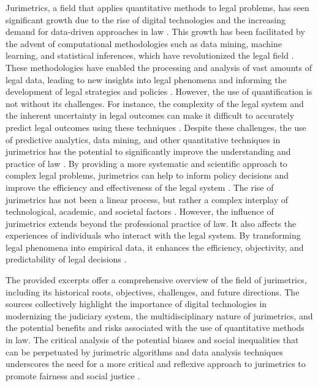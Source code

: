Jurimetrics, a field that applies quantitative methods to legal problems, has seen significant growth due to the rise of digital technologies and the increasing demand for data-driven approaches in law \cite{biasquantitativeanalyses1,loevinger1959}. This growth has been facilitated by the advent of computational methodologies such as data mining, machine learning, and statistical inferences, which have revolutionized the legal field \cite{loevinger1959}. These methodologies have enabled the processing and analysis of vast amounts of legal data, leading to new insights into legal phenomena and informing the development of legal strategies and policies \cite{ccdacdfbcdaf,efbfffafaacadd,loevinger1959}. However, the use of quantification is not without its challenges. For instance, the complexity of the legal system and the inherent uncertainty in legal outcomes can make it difficult to accurately predict legal outcomes using these techniques \cite{loevinger1959}. Despite these challenges, the use of predictive analytics, data mining, and other quantitative techniques in jurimetrics has the potential to significantly improve the understanding and practice of law \cite{loevinger1959}. By providing a more systematic and scientific approach to complex legal problems, jurimetrics can help to inform policy decisions and improve the efficiency and effectiveness of the legal system \cite{loevinger1959}. The rise of jurimetrics has not been a linear process, but rather a complex interplay of technological, academic, and societal factors \cite{loevinger1959}. However, the influence of jurimetrics extends beyond the professional practice of law. It also affects the experiences of individuals who interact with the legal system. By transforming legal phenomena into empirical data, it enhances the efficiency, objectivity, and predictability of legal decisions \cite{supiot2007,losano2006,101111/lsi12334,camargo_2009,sareen_et_al_2020,lynch_2017}.

The provided excerpts offer a comprehensive overview of the field of jurimetrics, including its historical roots, objectives, challenges, and future directions. The sources collectively highlight the importance of digital technologies in modernizing the judiciary system, the multidisciplinary nature of jurimetrics, and the potential benefits and risks associated with the use of quantitative methods in law. The critical analysis of the potential biases and social inequalities that can be perpetuated by jurimetric algorithms and data analysis techniques underscores the need for a more critical and reflexive approach to jurimetrics to promote fairness and social justice \cite{10.20396/rdbci.v18i0.8658889, 10.32586/rcda.v18i1.585, 10.1007/s11186-021-09453-1, demortain2019politics, 10.3390/fi9040068}.

